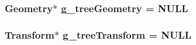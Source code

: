 \subsubsection[{g\_\-treeGeometry}]{\setlength{\rightskip}{0pt plus 5cm}Geometry$\ast$ {\bf g\_\-treeGeometry} = NULL}\label{main_8cpp_a2c3ae44c854b16d8ae7c8dc3b4e729fb}
\subsubsection[{g\_\-treeTransform}]{\setlength{\rightskip}{0pt plus 5cm}Transform$\ast$ {\bf g\_\-treeTransform} = NULL}\label{main_8cpp_a49c675fdd485d63c6f5895d8cd80facf}
